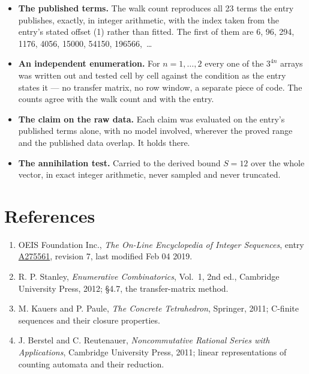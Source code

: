 \documentclass[11pt]{article}
\theoremstyle{definition}
\begin{document}
\begin{itemize}

\item {\bfseries The published terms.} The walk count reproduces all 23 terms the entry publishes, exactly, in integer arithmetic, with the index taken from the entry's stated offset (1) rather than fitted. The first of them are 6, 96, 294, 1176, 4056, 15000, 54150, 196566,~\dots

\item {\bfseries An independent enumeration.} For $n = 1,\dots,2$ every one of the $3^{4n}$ arrays was written out and tested cell by cell against the condition as the entry states it --- no transfer matrix, no row window, a separate piece of code. The counts agree with the walk count and with the entry.

\item {\bfseries The claim on the raw data.} Each claim was evaluated on the entry's published terms alone, with no model involved, wherever the proved range and the published data overlap. It holds there.

\item {\bfseries The annihilation test.} Carried to the derived bound $S = 12$ over the whole vector, in exact integer arithmetic, never sampled and never truncated.

\end{itemize}

\section{References}

\begin{enumerate}

\item OEIS Foundation Inc., \emph{The On-Line Encyclopedia of Integer Sequences}, entry \href{https://oeis.org/A275561}{A275561}, revision 7, last modified Feb 04 2019.

\item R. P. Stanley, \emph{Enumerative Combinatorics}, Vol.~1, 2nd ed., Cambridge University Press, 2012; \S4.7, the transfer-matrix method.

\item M. Kauers and P. Paule, \emph{The Concrete Tetrahedron}, Springer, 2011; C-finite sequences and their closure properties.

\item J. Berstel and C. Reutenauer, \emph{Noncommutative Rational Series with Applications}, Cambridge University Press, 2011; linear representations of counting automata and their reduction.

\end{enumerate}
\end{document}
